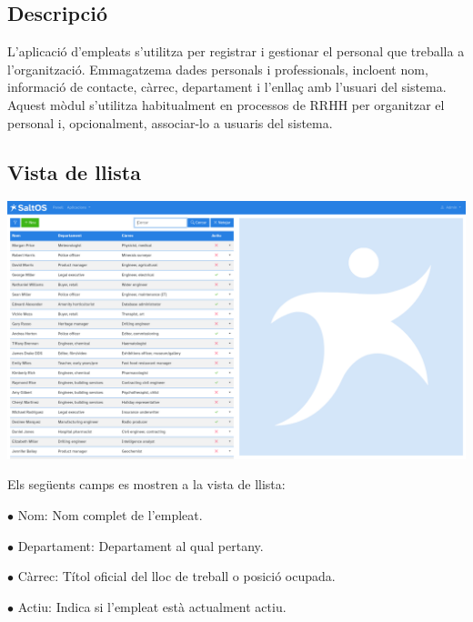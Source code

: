 \documentclass[a4paper]{article}
\begin{document}
\hypertarget{toc107}{}
\subsection{Descripció}

L'aplicació d'empleats s'utilitza per registrar i gestionar el personal que treballa a l'organització.
Emmagatzema dades personals i professionals, incloent nom, informació de contacte, càrrec, departament i l'enllaç amb l'usuari del sistema.
Aquest mòdul s'utilitza habitualment en processos de RRHH per organitzar el personal i, opcionalment, associar-lo a usuaris del sistema.

\hypertarget{toc108}{}
\subsection{Vista de llista}

\begin{center}\includegraphics[width=1\textwidth]{../ujest/snaps/test-screenshots-js-screenshots-hr-employees-list-ca-es-1-snap.png}\end{center}

Els següents camps es mostren a la vista de llista:

\begin{compactitem}
\item[\color{myblue}$\bullet$] Nom: Nom complet de l'empleat.
\item[\color{myblue}$\bullet$] Departament: Departament al qual pertany.
\item[\color{myblue}$\bullet$] Càrrec: Títol oficial del lloc de treball o posició ocupada.
\item[\color{myblue}$\bullet$] Actiu: Indica si l'empleat està actualment actiu.
\end{compactitem}
\end{document}

